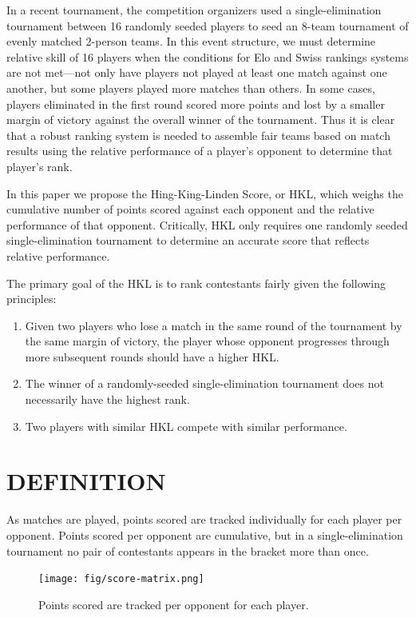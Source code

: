 \documentclass[letterpaper, 10 pt, conference]{ieeeconf}  %
\begin{document}
In a recent tournament, the competition organizers used a single-elimination tournament between 16 randomly seeded players to seed an 8-team tournament of evenly matched 2-person teams. 
In this event structure, we must determine relative skill of 16 players when the conditions for Elo and Swiss rankings systems are not met---not only have players not played at least one match against one another, but some players played more matches than others. In some cases, players eliminated in the first round scored more points and lost by a smaller margin of victory against the overall winner of the tournament. Thus it is clear that a robust ranking system is needed to assemble fair teams based on match results using the relative performance of a player's opponent to determine that player's rank.

In this paper we propose the Hing-King-Linden Score, or HKL, which weighs the cumulative number of points scored against each opponent and the relative performance of that opponent. 
Critically, HKL only requires one randomly seeded single-elimination tournament to determine an accurate score that reflects relative performance. 

The primary goal of the HKL is to rank contestants fairly given the following principles:

\begin{enumerate}
        \item Given two players who lose a match in the same round of the tournament by the same margin of victory, the player whose opponent progresses through more subsequent rounds should have a higher HKL.
        \item The winner of a randomly-seeded single-elimination tournament does not necessarily have the highest rank.
        \item Two players with similar HKL compete with similar performance.
\end{enumerate}

\section{DEFINITION}
As matches are played, points scored are tracked individually for each player per opponent. 
Points scored per opponent are cumulative, but in a single-elimination tournament no pair of contestants appears in the bracket more than once.

\begin{figure}[hb]
        \texttt{[image: fig/score-matrix.png]}
        \label{fig:raw-score}
        \centering
        \caption{Points scored are tracked per opponent for each player.}
\end{figure}
\end{document}
